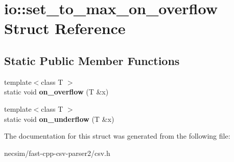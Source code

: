 \hypertarget{structio_1_1set__to__max__on__overflow}{}\section{io\+:\+:set\+\_\+to\+\_\+max\+\_\+on\+\_\+overflow Struct Reference}
\label{structio_1_1set__to__max__on__overflow}
\subsection*{Static Public Member Functions}
\begin{DoxyCompactItemize}
\item 
{\footnotesize template$<$class T $>$ }\\static void {\bfseries on\+\_\+overflow} (T \&x)\hypertarget{structio_1_1set__to__max__on__overflow_a770dee97a1ee55131163e6be8d4c0d9d}{}\label{structio_1_1set__to__max__on__overflow_a770dee97a1ee55131163e6be8d4c0d9d}

\item 
{\footnotesize template$<$class T $>$ }\\static void {\bfseries on\+\_\+underflow} (T \&x)\hypertarget{structio_1_1set__to__max__on__overflow_a812d316e2b23247df19ca83bfda90a59}{}\label{structio_1_1set__to__max__on__overflow_a812d316e2b23247df19ca83bfda90a59}

\end{DoxyCompactItemize}


The documentation for this struct was generated from the following file\+:\begin{DoxyCompactItemize}
\item 
necsim/fast-\/cpp-\/csv-\/parser2/csv.\+h\end{DoxyCompactItemize}
